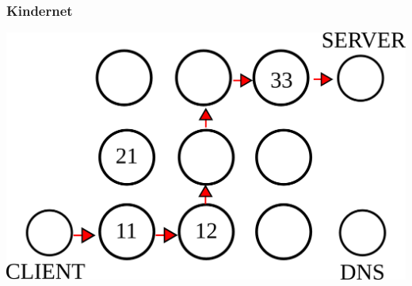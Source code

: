 \documentclass[12pt]{beamer}
\begin{document}
\begin{frame}
\begin{center}
  \end{center}
\end{frame}

\begin{frame}
    \frametitle{Kindernet}
    \includegraphics[height=0.6\textheight]{img/kindernet.png}
\end{frame}
\end{document}
